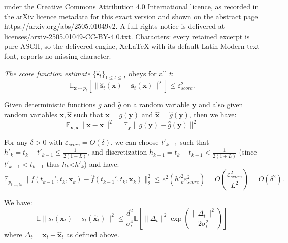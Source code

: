 \documentclass[10pt,a4paper]{amsart}
\def\rvx{{\mathbf{x}}}
\def\rvy{{\mathbf{y}}}
\def\vs{{\bm{s}}}
\newcommand{\E}{\mathbb{E}}
\begin{document}
under the Creative Commons Attribution 4.0 International licence, as recorded in the arXiv licence metadata for this exact version and shown on the abstract page https://arxiv.org/abs/2505.01049v2. A full rights notice is delivered at licenses/arxiv-2505.01049-CC-BY-4.0.txt. Characters: every retained excerpt is pure ASCII, so the delivered engine, XeLaTeX with its default Latin Modern text font, reports no missing character.
\begin{assumption}
\label{assumption_score_est}
    \textit{The score function estimate} $\{\hat{\vs}_t\}_{1\leq t \leq T}$ obeys for all $t$:
    \begin{equation}
    \label{eq_score_est}
     \mathbb{E}_{\rvx \sim p_{t}}\left [\|\hat{\vs}_{t}(\rvx)- \vs_{t}(\rvx)\|^2 \right ] \leq \varepsilon^2_{score}.
\end{equation}

\end{assumption}

\begin{lemma}
\label{change_of_var_lemma}
    Given deterministic functions $g$ and $\hat{g}$ on a random variable $\rvy$ and also given random variables $\rvx,\hat{\rvx}$
 such that $\rvx=g(\rvy)$ and $\hat{\rvx}=\hat{g}(\rvy)$, then we have:
 \[
 \mathbb{E}_{\rvx,\hat{\rvx}}\|\rvx-\hat{\rvx}\|^2 = \mathbb{E}_{\rvy}\|g(\rvy)-\hat{g}(\rvy)\|^2
 \]
 \end{lemma}

\begin{lemma}
\label{main_lemma_smooth}
  For any $\delta>0$ with $\varepsilon_{score} = O(\delta)$, we can choose $t'_{k-1}$ such that $h'_k=t_{k}-t'_{k-1}  \leq \frac{1}{2(1+L)}$, and discretization 
$h_{k-1} = t_{k}-t_{k-1} < \frac{1}{2(1+L)}$ (since $t'_{k-1}<t_{k-1}$ thus $h_k$<$h'_k$) and have:
\[
  \E_{{p}_{t_1,.., t_{K}}}  
  \|
  f(t_{k-1}',t_k,{\rvx}_k)-\hat{f}(t_{k-1}',t_k,{\rvx}_k)\|_2^2 \leq e^2({h'}_k^2\varepsilon^2_{score}) = {O}\left( \frac{ \varepsilon^2_{score}}{L^2}\right) = 
  {O}(\delta^2) .
\]
\end{lemma}

\begin{lemma}
\label{expected_smooth}
 We have:
 \begin{equation}
     \mathbb{E}\|s_t(\rvx_t)-s_t(\hat{\rvx}_t)\|^2 \leq \frac{d^2}{\sigma_t^4}\mathbb{E}\left[ \|\Delta_t\|^2\exp\left(\frac{\|\Delta_t\|^2}{2\sigma_t^2}\right) \right]
 \end{equation}
 where $\Delta_t = \rvx_t-\hat{\rvx}_t$ as defined above.
\end{lemma}
\end{document}
